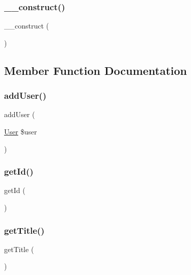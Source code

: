\subsubsection{\texorpdfstring{\_\_construct()}{\_\_construct()}}
{\footnotesize\ttfamily \+\_\+\+\_\+construct (\begin{DoxyParamCaption}{ }\end{DoxyParamCaption})}



\subsection{Member Function Documentation}
\mbox{\label{class_app_1_1_entity_1_1_role_af15e3605d4dc1c169f30bfb79314eed1}} 
\subsubsection{\texorpdfstring{addUser()}{addUser()}}
{\footnotesize\ttfamily add\+User (\begin{DoxyParamCaption}\item[{\mbox{\hyperlink{class_app_1_1_entity_1_1_user}{User}}}]{\$user }\end{DoxyParamCaption})}

\mbox{\label{class_app_1_1_entity_1_1_role_a12251d0c022e9e21c137a105ff683f13}} 
\subsubsection{\texorpdfstring{getId()}{getId()}}
{\footnotesize\ttfamily get\+Id (\begin{DoxyParamCaption}{ }\end{DoxyParamCaption})}

\mbox{\label{class_app_1_1_entity_1_1_role_a95e859a4588a39a1824b717378a84c29}} 
\subsubsection{\texorpdfstring{getTitle()}{getTitle()}}
{\footnotesize\ttfamily get\+Title (\begin{DoxyParamCaption}{ }\end{DoxyParamCaption})}

